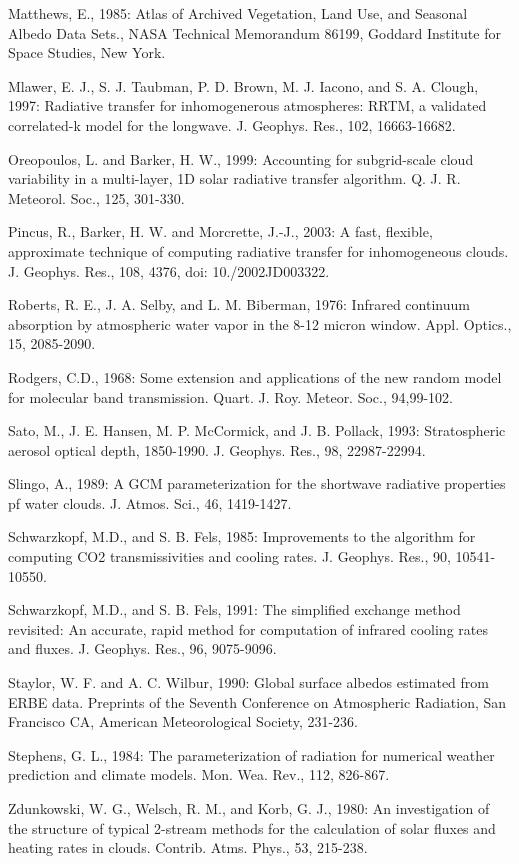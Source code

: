 Matthews, E., 1985\+: Atlas of Archived Vegetation, Land Use, and Seasonal Albedo Data Sets., N\+A\+SA Technical Memorandum 86199, Goddard Institute for Space Studies, New York.

Mlawer, E. J., S. J. Taubman, P. D. Brown, M. J. Iacono, and S. A. Clough, 1997\+: Radiative transfer for inhomogenerous atmospheres\+: R\+R\+TM, a validated correlated-\/k model for the longwave. J. Geophys. Res., 102, 16663-\/16682.

Oreopoulos, L. and Barker, H. W., 1999\+: Accounting for subgrid-\/scale cloud variability in a multi-\/layer, 1D solar radiative transfer algorithm. Q. J. R. Meteorol. Soc., 125, 301-\/330.

Pincus, R., Barker, H. W. and Morcrette, J.-\/J., 2003\+: A fast, flexible, approximate technique of computing radiative transfer for inhomogeneous clouds. J. Geophys. Res., 108, 4376, doi\+: 10./2002\+J\+D003322.

Roberts, R. E., J. A. Selby, and L. M. Biberman, 1976\+: Infrared continuum absorption by atmospheric water vapor in the 8-\/12 micron window. Appl. Optics., 15, 2085-\/2090.

Rodgers, C.\+D., 1968\+: Some extension and applications of the new random model for molecular band transmission. Quart. J. Roy. Meteor. Soc., 94,99-\/102.

Sato, M., J. E. Hansen, M. P. Mc\+Cormick, and J. B. Pollack, 1993\+: Stratospheric aerosol optical depth, 1850-\/1990. J. Geophys. Res., 98, 22987-\/22994.

Slingo, A., 1989\+: A G\+CM parameterization for the shortwave radiative properties pf water clouds. J. Atmos. Sci., 46, 1419-\/1427.

Schwarzkopf, M.\+D., and S. B. Fels, 1985\+: Improvements to the algorithm for computing C\+O2 transmissivities and cooling rates. J. Geophys. Res., 90, 10541-\/10550.

Schwarzkopf, M.\+D., and S. B. Fels, 1991\+: The simplified exchange method revisited\+: An accurate, rapid method for computation of infrared cooling rates and fluxes. J. Geophys. Res., 96, 9075-\/9096.

Staylor, W. F. and A. C. Wilbur, 1990\+: Global surface albedos estimated from E\+R\+BE data. Preprints of the Seventh Conference on Atmospheric Radiation, San Francisco CA, American Meteorological Society, 231-\/236.

Stephens, G. L., 1984\+: The parameterization of radiation for numerical weather prediction and climate models. Mon. Wea. Rev., 112, 826-\/867.

Zdunkowski, W. G., Welsch, R. M., and Korb, G. J., 1980\+: An investigation of the structure of typical 2-\/stream methods for the calculation of solar fluxes and heating rates in clouds. Contrib. Atms. Phys., 53, 215-\/238. 